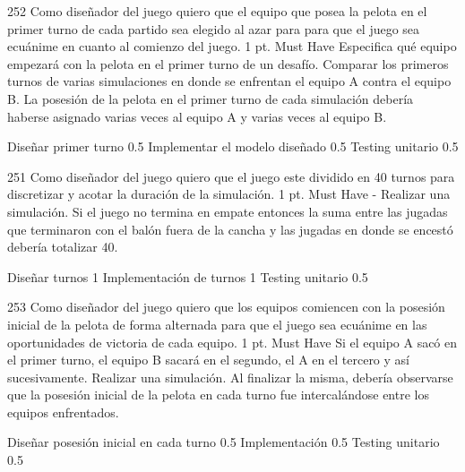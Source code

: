 \sprintstory
{252}
{Como diseñador del juego quiero que el equipo que posea la pelota en el primer turno de cada partido sea elegido al azar para para que el juego sea ecuánime en cuanto al comienzo del juego.}
{1 pt.}
{Must Have}
{Especifica qué equipo empezará con la pelota en el primer turno de un desafío.}
{Comparar los primeros turnos de varias simulaciones en donde se enfrentan el equipo A contra el equipo B. La posesión de la pelota en el primer turno de cada simulación debería haberse asignado varias veces al equipo A y varias veces al equipo B.}

\begin{taskstable}
 \task
 {Diseñar primer turno}
 {0.5}
 \task
 {Implementar el modelo diseñado}
 {0.5}
 \task
 {Testing unitario}
 {0.5}
\end{taskstable}

\vspace{1cm}


\sprintstory
{251}
{Como diseñador del juego quiero que el juego este dividido en 40 turnos para discretizar y acotar la duración de la simulación.}
{1 pt.}
{Must Have}
{-}
{Realizar una simulación. Si el juego no termina en empate entonces la suma entre las jugadas que terminaron con el balón fuera de la cancha y las jugadas en donde se encestó debería totalizar 40.}

\begin{taskstable}
 \task
 {Diseñar turnos}
 {1}
 \task
 {Implementación de turnos}
 {1}
 \task
 {Testing unitario}
 {0.5}
\end{taskstable}

\vspace{1cm}


\sprintstory
{253}
{Como diseñador del juego quiero que los equipos comiencen con la posesión inicial de la pelota de forma alternada para que el juego sea ecuánime en las oportunidades de victoria de cada equipo.}
{1 pt.}
{Must Have}
{Si el equipo A sacó en el primer turno, el equipo B sacará en el segundo, el A en el tercero y así sucesivamente.}
{Realizar una simulación. Al finalizar la misma, debería observarse que la posesión inicial de la pelota en cada turno fue intercalándose entre los equipos enfrentados.}

\begin{taskstable}
 \task
 {Diseñar posesión inicial en cada turno}
 {0.5}
 \task
 {Implementación}
 {0.5}
 \task
 {Testing unitario}
 {0.5}
\end{taskstable}

